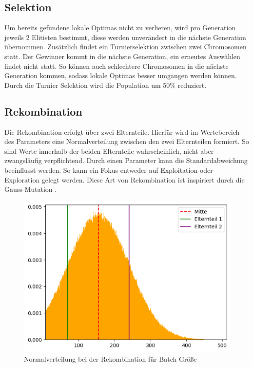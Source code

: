 \subsection{Selektion}
Um bereits gefundene lokale Optimas nicht zu verlieren, wird pro Generation jeweils 2 Elitisten bestimmt, diese werden unverändert in die nächste Generation übernommen. Zusätzlich findet ein Turnierselektion zwischen zwei Chromosomen statt. Der Gewinner kommt in die nächste Generation, ein erneutes Auswählen findet nicht statt. So können auch schlechtere Chromosomen in die nächste Generation kommen, sodass lokale Optimas besser umgangen werden können. Durch die Turnier Selektion wird die Population um 50\% reduziert.
\subsection{Rekombination}
Die Rekombination erfolgt über zwei Elternteile. Hierfür wird im Wertebereich des Parameters eine Normalverteilung zwischen den zwei Elternteilen formiert. So sind Werte innerhalb der beiden Elternteile wahrscheinlich, nicht aber zwangsläufig verpflichtend. Durch einen Parameter kann die Standardabweichung beeinflusst werden. So kann ein Fokus entweder auf Exploitation oder Exploration gelegt werden. Diese Art von Rekombination ist inspiriert durch die Gauss-Mutation \parencite[Seite~8]{kruse_evolutionare_2013}. 
\begin{figure}[h]
	\centering
	\includegraphics[width=1\linewidth]{rekombination.png}
	\caption{Normalverteilung bei der Rekombination für Batch Größe}
	\label{fig:enter-label}
\end{figure}

